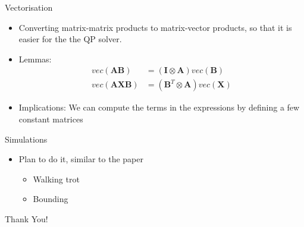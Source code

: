 \documentclass{beamer}
\begin{document}
\begin{frame}{Vectorisation}
\begin{itemize}
    \item Converting matrix-matrix products to matrix-vector products, so that it is easier for the the QP solver.
    \item Lemmas:
        \begin{align}
            vec (\mathbf{AB}) & = (\mathbf{I} \otimes \mathbf{A}) vec(\mathbf{B})
            \\ 
            vec (\mathbf{AXB}) & = (\mathbf{B}^T \otimes \mathbf{A}) vec(\mathbf{X})
        \end{align}
    \item Implications:
    We can compute the terms in the expressions by defining a few constant matrices
\end{itemize}
\end{frame}

\begin{frame}{Simulations}
\begin{itemize}
    \item Plan to do it, similar to the paper
    \begin{itemize}
        \item Walking trot
        \item Bounding
    \end{itemize}
\end{itemize}
\end{frame}

\begin{frame}
	\LARGE{Thank You!}
\end{frame}\normalfont
\end{document}
